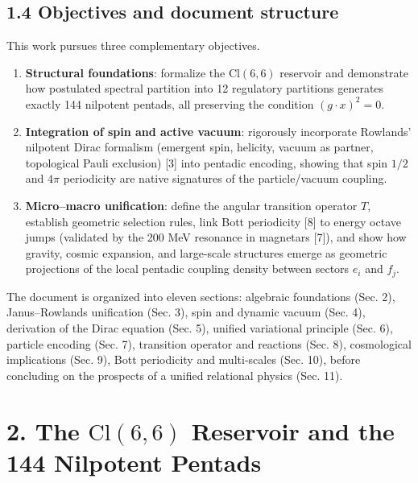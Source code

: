 \documentclass[11pt]{article}
\providecommand{\tightlist}{\setlength{\itemsep}{2pt}\setlength{\parskip}{6pt}}
\providecommand{\tightlist}{%
  \setlength{\itemsep}{2pt}\setlength{\parskip}{6pt}
}
\begin{document}
\hypertarget{objectives-and-document-structure}{%
\subsection{1.4 Objectives and document
structure}\label{objectives-and-document-structure}}

This work pursues three complementary objectives.

\begin{enumerate}
\def\labelenumi{\arabic{enumi}.}
\tightlist
\item
  \textbf{Structural foundations}: formalize the \(\text{Cl}(6,6)\)
  reservoir and demonstrate how postulated spectral partition into 12
  regulatory partitions generates exactly 144 nilpotent pentads, all
  preserving the condition \((g\cdot x)^2=0\).
\item
  \textbf{Integration of spin and active vacuum}: rigorously incorporate
  Rowlands' nilpotent Dirac formalism (emergent spin, helicity, vacuum
  as partner, topological Pauli exclusion) {[}3{]} into pentadic
  encoding, showing that spin \(1/2\) and \(4\pi\) periodicity are
  native signatures of the particle/vacuum coupling.
\item
  \textbf{Micro--macro unification}: define the angular transition
  operator \(T\), establish geometric selection rules, link Bott
  periodicity {[}8{]} to energy octave jumps (validated by the 200 MeV
  resonance in magnetars {[}7{]}), and show how gravity, cosmic
  expansion, and large-scale structures emerge as geometric projections
  of the local pentadic coupling density between sectors \(e_i\) and
  \(f_j\).
\end{enumerate}

The document is organized into eleven sections: algebraic foundations
(Sec. 2), Janus--Rowlands unification (Sec. 3), spin and dynamic vacuum
(Sec. 4), derivation of the Dirac equation (Sec. 5), unified variational
principle (Sec. 6), particle encoding (Sec. 7), transition operator and
reactions (Sec. 8), cosmological implications (Sec. 9), Bott periodicity
and multi-scales (Sec. 10), before concluding on the prospects of a
unified relational physics (Sec. 11).

\hypertarget{the-textcl66-reservoir-and-the-144-nilpotent-pentads}{%
\section{\texorpdfstring{2. The \(\text{Cl}(6,6)\) Reservoir and the 144
Nilpotent
Pentads}{2. The \textbackslash text\{Cl\}(6,6) Reservoir and the 144 Nilpotent Pentads}}\label{the-textcl66-reservoir-and-the-144-nilpotent-pentads}}
\end{document}
